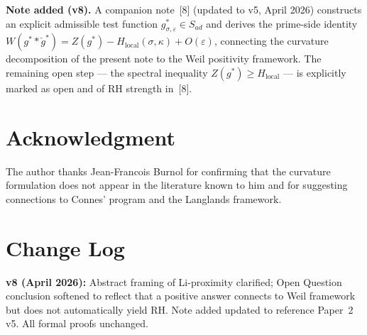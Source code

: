 \documentclass[11pt]{article}
\begin{document}
\medskip
\textbf{Note added (v8).} A companion note~[8]
(updated to v5, April 2026) constructs an explicit
admissible test function $g^*_{\sigma,\varepsilon}
\in S_{ad}$ and derives the prime-side identity
$W(g^*\ast\check{g}^*) = Z(g^*) -
H_{\mathrm{local}}(\sigma,\kappa) + O(\varepsilon)$,
connecting the curvature decomposition of the
present note to the Weil positivity framework.
The remaining open step --- the spectral inequality
$Z(g^*) \ge H_{\mathrm{local}}$ --- is explicitly
marked as open and of RH strength in~[8].

\section*{Acknowledgment}
The author thanks Jean-Francois Burnol for confirming that the curvature formulation does not appear in the literature known to him and for suggesting connections to Connes' program and the Langlands framework.

\section*{Change Log}
\textbf{v8 (April 2026):}
Abstract framing of Li-proximity clarified;
Open Question conclusion softened to reflect
that a positive answer connects to Weil framework
but does not automatically yield RH.
Note added updated to reference Paper~2 v5.
All formal proofs unchanged.
\end{document}
